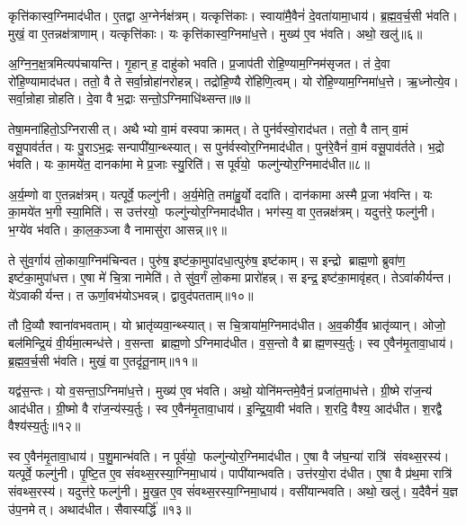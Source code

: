 कृत्ति॑कास्व॒ग्निमाद॑धीत। ए॒तद्वा अ॒ग्नेर्नक्ष॑त्रम्। यत्कृत्ति॑काः। स्वाया॑मै॒वैनं॑ दे॒वता॑यामा॒धाय॑। ब्र॒ह्म॒व॒र्च॒सी भ॑वति। मुखं॒ वा ए॒तन्नक्ष॑त्राणाम्। यत्कृत्ति॑काः। यः कृत्ति॑कास्व॒ग्निमा॑ध॒त्ते। मुख्य॑ ए॒व भ॑वति। अथो॒ खलु॑॥६॥

अ॒ग्नि॒न॒क्ष॒त्रमित्यप॑चायन्ति। गृ॒हान् ह॒ दाहु॑को भवति। प्र॒जाप॑ती रोहि॒ण्याम॒ग्निम॑सृजत। तं दे॒वा रो॑हि॒ण्यामाद॑धत। ततो॒ वै ते सर्वा॒न्रोहा॑नरोहन्न्। तद्रो॑हि॒ण्यै रो॑हिणि॒त्वम्। यो रो॑हि॒ण्याम॒ग्निमा॑ध॒त्ते। ऋ॒ध्नोत्ये॒व। सर्वा॒न्रोहान्रोहति। दे॒वा वै भ॒द्राः सन्तो॒ऽग्निमाधि॑थ्सन्त॥७॥

तेषा॒मना॑हितो॒ऽग्निरासीत्। अथैभ्यो वा॒मं वस्वपाक्रामत्। ते पुन॑र्वस्वो॒राद॑धत। ततो॒ वै तान् वा॒मं वसू॒पाव॑र्तत। यः पु॒राऽभ॒द्रः सन्पापी॑या॒न्थ्स्यात्। स पुन॑र्वस्वोर॒ग्निमाद॑धीत। पुन॑रे॒वैनं॑ वा॒मं वसू॒पाव॑र्तते। भ॒द्रो भ॑वति। यः का॒मये॑त॒ दानका॑मा मे प्र॒जाः स्यु॒रिति॑। स पूर्व॑यो॒ फल्गु॑न्योर॒ग्निमाद॑धीत॥८॥

अ॒र्य॒म्णो वा ए॒तन्नक्ष॑त्रम्। यत्पूर्वे॒ फल्गु॑नी। अ॒र्य॒मेति॒ तमा॑हु॒र्यो ददा॑ति। दान॑कामा अस्मै प्र॒जा भ॑वन्ति। यः का॒मये॑त भ॒गी स्या॒मिति॑। स उत्त॑रयो॒ फल्गु॑न्योर॒ग्निमाद॑धीत। भग॑स्य॒ वा ए॒तन्नक्ष॑त्रम्। यदुत्त॑रे॒ फल्गु॑नी। भ॒ग्ये॑व भ॑वति। का॒ल॒क॒ञ्जा वै नामासु॑रा आसन्न्॥९॥

ते सु॑व॒र्गाय॑ लो॒काया॒ग्निम॑चिन्वत। पुरु॑ष॒ इष्ट॑का॒मुपा॑दधा॒त्पुरु॑ष॒ इष्ट॑काम्। स इन्द्रो ब्राह्म॒णो ब्रुवा॑ण॒ इष्ट॑का॒मुपा॑धत्त। ए॒षा मे॑ चि॒त्रा नामेति॑। ते सु॑व॒र्गं लो॒कमा प्रारो॑हन्न्। स इन्द्र॒ इष्ट॑का॒मावृ॑हत्। तेऽवा॑कीर्यन्त। ये॑ऽवाकीर्यन्त। त ऊर्णा॒वभ॑योऽभवन्न्। द्वावुद॑पतताम्॥१०॥

तौ दि॒व्यौ श्वाना॑वभवताम्। यो भ्रातृ॑व्यवा॒न्थ्स्यात्। स चि॒त्राया॑म॒ग्निमाद॑धीत। अ॒व॒कीर्यै॒व भ्रातृ॑व्यान्। ओजो॒ बल॑मिन्द्रि॒यं वी॒र्य॑मा॒त्मन्ध॑त्ते। व॒सन्ता ब्राह्म॒णोऽग्निमाद॑धीत। व॒स॒न्तो वै ब्राह्म॒णस्य॒र्तुः। स्व ए॒वैन॑मृ॒तावा॒धाय॑। ब्र॒ह्म॒व॒र्च॒सी भ॑वति। मुखं॒ वा ए॒तदृ॑तू॒नाम्॥११॥

यद्व॑स॒न्तः। यो व॒सन्ता॒ऽग्निमा॑ध॒त्ते। मुख्य॑ ए॒व भ॑वति। अथो॒ योनि॑मन्तमे॒वैनं॒ प्रजा॑त॒माध॑त्ते। ग्री॒ष्मे रा॑ज॒न्य॑ आद॑धीत। ग्री॒ष्मो वै रा॑ज॒न्य॑स्य॒र्तुः। स्व ए॒वैन॑मृ॒तावा॒धाय॑। इ॒न्द्रि॒या॒वी भ॑वति। श॒रदि॒ वैश्य॒ आद॑धीत। श॒रद्वै वैश्य॑स्य॒र्तुः॥१२॥

स्व ए॒वैन॑मृ॒तावा॒धाय॑। प॒शु॒मान्भ॑वति। न पूर्व॑यो॒ फल्गु॑न्योर॒ग्निमाद॑धीत। ए॒षा वै ज॑घ॒न्या॑ रात्रि॑ संवथ्स॒रस्य॑। यत्पूर्वे॒ फल्गु॑नी। पृ॒ष्टि॒त ए॒व सं॑वथ्स॒रस्या॒ग्निमा॒धाय॑। पापी॑यान्भवति। उत्त॑रयो॒रा द॑धीत। ए॒षा वै प्र॑थ॒मा रात्रि॑ संवथ्स॒रस्य॑। यदुत्त॑रे॒ फल्गु॑नी। मु॒ख॒त ए॒व सं॑वथ्स॒रस्या॒ग्निमा॒धाय॑। वसी॑यान्भवति। अथो॒ खलु॑। य॒दैवैनं॑ य॒ज्ञ उ॑प॒नमेत्। अथाद॑धीत। सैवास्यर्द्धि॑॥१३॥
\anuvakamend[खल्वा॑धिथ्सन्त॒ फल्गु॑न्योर॒ग्निमाद॑धीतासन्नपततामृतू॒नां वैश्य॑स्य॒र्तुरुत्त॑रे॒ फल्गु॑नी॒ षट्च॑]

